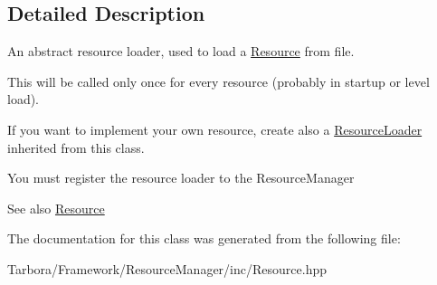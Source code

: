 \subsection{Detailed Description}
An abstract resource loader, used to load a \hyperlink{classTarbora_1_1Resource}{Resource} from file. 

This will be called only once for every resource (probably in startup or level load).

If you want to implement your own resource, create also a \hyperlink{classTarbora_1_1ResourceLoader}{Resource\+Loader} inherited from this class.

You must register the resource loader to the Resource\+Manager

\begin{DoxySeeAlso}{See also}
\hyperlink{classTarbora_1_1Resource}{Resource} 
\end{DoxySeeAlso}


The documentation for this class was generated from the following file\+:\begin{DoxyCompactItemize}
\item 
Tarbora/\+Framework/\+Resource\+Manager/inc/Resource.\+hpp\end{DoxyCompactItemize}
